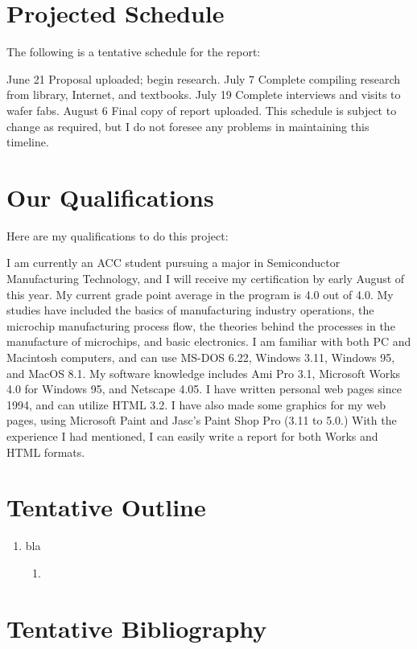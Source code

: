 \section*{Projected Schedule}
The following is a tentative schedule for the report:

June 21	Proposal uploaded; begin research.
July 7	Complete compiling research from library, Internet, and textbooks.
July 19	Complete interviews and visits to wafer fabs.
August 6	Final copy of report uploaded.
This schedule is subject to change as required, but I do not foresee any problems in maintaining this timeline.
\section*{Our Qualifications}
Here are my qualifications to do this project:

I am currently an ACC student pursuing a major in Semiconductor Manufacturing Technology, and I will receive my certification by early August of this year.
My current grade point average in the program is 4.0 out of 4.0. My studies have included the basics of manufacturing industry operations, the microchip manufacturing process flow, the theories behind the processes in the manufacture of microchips, and basic electronics.
I am familiar with both PC and Macintosh computers, and can use MS-DOS 6.22, Windows 3.11, Windows 95, and MacOS 8.1. My software knowledge includes Ami Pro 3.1, Microsoft Works 4.0 for Windows 95, and Netscape 4.05.
I have written personal web pages since 1994, and can utilize HTML 3.2. I have also made some graphics for my web pages, using Microsoft Paint and Jasc's Paint Shop Pro (3.11 to 5.0.)
With the experience I had mentioned, I can easily write a report for both Works and HTML formats.
\section*{Tentative Outline}
\begin{enumerate} [label=\Roman*.]
\item bla
\begin{enumerate} [label=\Alph*.]
\item 
\end{enumerate}
\end{enumerate}
\section*{Tentative Bibliography}
\nocite{*}
\printbibliography[heading=none]
